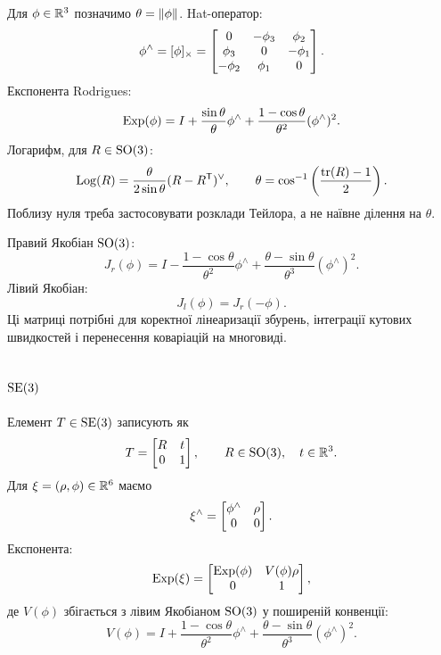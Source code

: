 Для $\phi\in\mathbb{R}^3$ позначимо $\theta=\left\lVert \phi\right\rVert$. Hat-оператор:
\begin{equation}
 \phi^\wedge=[\phi]_{\times}=\begin{bmatrix}0&-\phi_3&\phi_2\\ \phi_3&0&-\phi_1\\ -\phi_2&\phi_1&0\end{bmatrix}.
\end{equation}
Експонента Rodrigues:
\begin{equation}
 \mathrm{Exp}(\phi)=I+\frac{\sin\theta}{\theta}\phi^\wedge+
 \frac{1-\cos\theta}{\theta^2}(\phi^\wedge)^2.
\end{equation}
Логарифм, для $R\in\mathrm{SO}(3)$:
\begin{equation}
 \mathrm{Log}(R)=\frac{\theta}{2\sin\theta}(R-R^{\mathsf T})^\vee,
 \qquad \theta=\cos^{-1}\left(\frac{\operatorname{tr}(R)-1}{2}\right).
\end{equation}
Поблизу нуля треба застосовувати розклади Тейлора, а не наївне ділення на $\theta$.

Правий Якобіан $\mathrm{SO}(3)$:
\begin{equation}
 J_r(\phi)=I-\frac{1-\cos\theta}{\theta^2}\phi^\wedge+
 \frac{\theta-\sin\theta}{\theta^3}(\phi^\wedge)^2.
\end{equation}
Лівий Якобіан:
\begin{equation}
 J_l(\phi)=J_r(-\phi).
\end{equation}
Ці матриці потрібні для коректної лінеаризації збурень, інтеграції кутових швидкостей і перенесення коваріацій на многовиді.

\subsection{$\mathrm{SE}(3)$}

Елемент $T\in\mathrm{SE}(3)$ записують як
\begin{equation}
 T=\begin{bmatrix}R&t\\0&1\end{bmatrix},\qquad R\in\mathrm{SO}(3),\quad t\in\mathbb{R}^3.
\end{equation}
Для $\xi=(\rho,\phi)\in\mathbb{R}^6$ маємо
\begin{equation}
 \xi^\wedge=\begin{bmatrix}\phi^\wedge&\rho\\0&0\end{bmatrix}.
\end{equation}
Експонента:
\begin{equation}
 \mathrm{Exp}(\xi)=\begin{bmatrix}\mathrm{Exp}(\phi)&V(\phi)\rho\\0&1\end{bmatrix},
\end{equation}
де $V(\phi)$ збігається з лівим Якобіаном $\mathrm{SO}(3)$ у поширеній конвенції:
\begin{equation}
 V(\phi)=I+\frac{1-\cos\theta}{\theta^2}\phi^\wedge+
 \frac{\theta-\sin\theta}{\theta^3}(\phi^\wedge)^2.
\end{equation}

